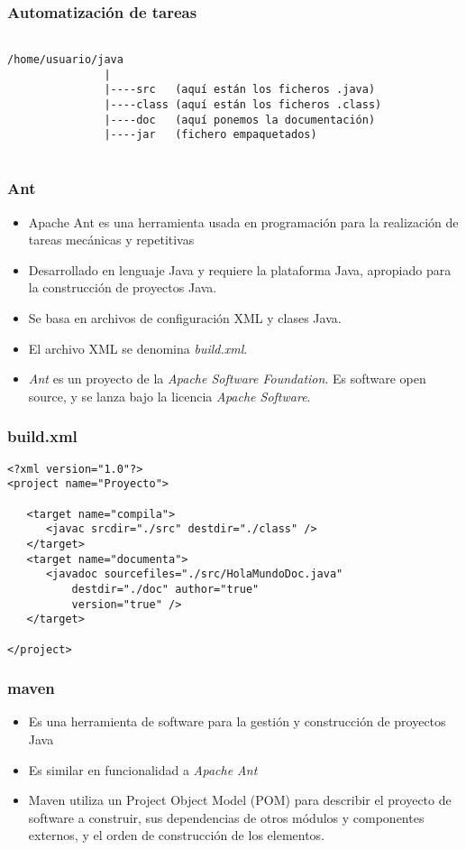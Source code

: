 \documentclass{beamer}
\begin{document}
\begin{frame}[fragile]
\frametitle{Automatización de tareas}
\begin{verbatim} 

/home/usuario/java
               |
               |----src   (aquí están los ficheros .java)
               |----class (aquí están los ficheros .class)
               |----doc   (aquí ponemos la documentación)
               |----jar   (fichero empaquetados)
               
\end{verbatim}
\end{frame}

\begin{frame}
\frametitle{Ant}
\begin{itemize}[<+->]
\item \alert{Apache Ant} es una herramienta usada en programación para la realización de tareas mecánicas y repetitivas
\item Desarrollado en lenguaje Java y requiere la plataforma Java, apropiado para la construcción de proyectos Java.
\item Se basa en archivos de configuración XML y clases Java.
\item El archivo XML se denomina \emph{build.xml}.
\item \emph{Ant} es un proyecto de la \emph{Apache Software Foundation}. Es software open source, y se lanza bajo la licencia \emph{Apache Software}.
\end{itemize}
\end{frame}

\begin{frame}[fragile]
\frametitle{build.xml}
\begin{verbatim} 
<?xml version="1.0"?>
<project name="Proyecto">

   <target name="compila">
      <javac srcdir="./src" destdir="./class" />
   </target>
   <target name="documenta">
      <javadoc sourcefiles="./src/HolaMundoDoc.java" 
          destdir="./doc" author="true" 
          version="true" />
   </target>

</project>
\end{verbatim}
\end{frame}

\begin{frame}[fragile]
\frametitle{maven}
\begin{itemize}[<+->]
\item Es una herramienta de software para la gestión y construcción de proyectos Java 
\item Es similar en funcionalidad a \emph{Apache Ant}
\item Maven utiliza un Project Object Model (POM) para describir el proyecto de software a construir, sus dependencias de otros módulos y componentes externos, y el orden de construcción de los elementos.
\end{itemize}
\end{frame}
\end{document}
